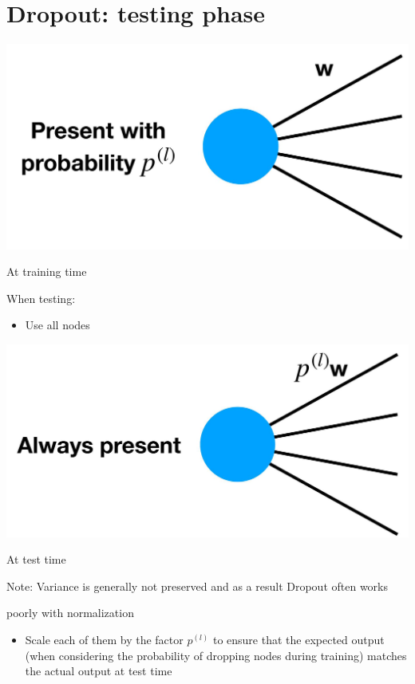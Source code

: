 \documentclass[10pt]{article}
\begin{document}
\section*{Dropout: testing phase}
\begin{center}
\includegraphics[max width=\textwidth]{2024_01_08_959e2db67a31f073f6d2g-31}
\end{center}

At training time

When testing:

\begin{itemize}
  \item Use all nodes
\end{itemize}

\begin{center}
\includegraphics[max width=\textwidth]{2024_01_08_959e2db67a31f073f6d2g-31(1)}
\end{center}

At test time

Note: Variance is generally not preserved and as a result Dropout often works

poorly with normalization

\begin{itemize}
  \item Scale each of them by the factor $p^{(l)}$ to ensure that the expected output (when considering the probability of dropping nodes during training) matches the actual output at test time
\end{itemize}
\end{document}
